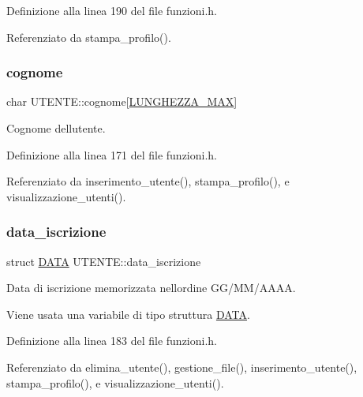 Definizione alla linea 190 del file funzioni.\+h.



Referenziato da stampa\+\_\+profilo().

\mbox{\label{struct_u_t_e_n_t_e_ad7797bd318a25af80b02a7751ebd4b9a}} 
\subsubsection{\texorpdfstring{cognome}{cognome}}
{\footnotesize\ttfamily char U\+T\+E\+N\+T\+E\+::cognome\mbox{[}\mbox{\hyperlink{funzioni_8h_a2cdd71b92d6e869f8b094e32a6da6a62}{L\+U\+N\+G\+H\+E\+Z\+Z\+A\+\_\+\+M\+AX}}\mbox{]}}

Cognome dell\textquotesingle{}utente. 

Definizione alla linea 171 del file funzioni.\+h.



Referenziato da inserimento\+\_\+utente(), stampa\+\_\+profilo(), e visualizzazione\+\_\+utenti().

\mbox{\label{struct_u_t_e_n_t_e_adad490891a61a9c3d48062baa067c1e9}} 
\subsubsection{\texorpdfstring{data\+\_\+iscrizione}{data\_iscrizione}}
{\footnotesize\ttfamily struct \mbox{\hyperlink{struct_d_a_t_a}{D\+A\+TA}} U\+T\+E\+N\+T\+E\+::data\+\_\+iscrizione}



Data di iscrizione memorizzata nell\textquotesingle{}ordine G\+G/\+M\+M/\+A\+A\+AA. 

Viene usata una variabile di tipo struttura \mbox{\hyperlink{struct_d_a_t_a}{D\+A\+TA}}. 

Definizione alla linea 183 del file funzioni.\+h.



Referenziato da elimina\+\_\+utente(), gestione\+\_\+file(), inserimento\+\_\+utente(), stampa\+\_\+profilo(), e visualizzazione\+\_\+utenti().

\mbox{\label{struct_u_t_e_n_t_e_aae6578862368788ad3bbc4af47a36ee0}} 

